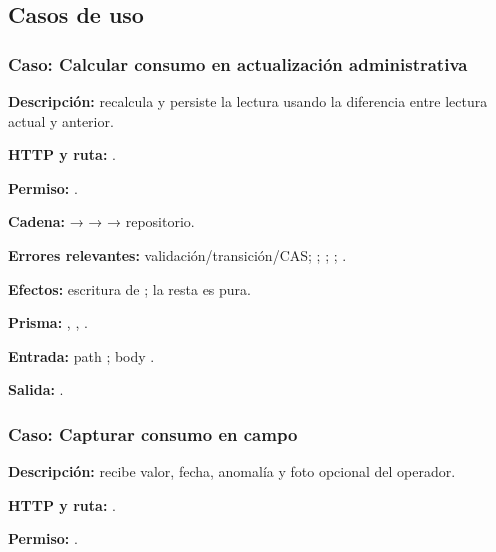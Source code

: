 \subsection{Casos de uso}


\subsubsection{Caso: Calcular consumo en actualización administrativa}


\textbf{Descripción:} recalcula y persiste la lectura usando la diferencia entre lectura actual y anterior.  

\textbf{HTTP y ruta:} \texttt{}.  

\textbf{Permiso:} \texttt{}.  

\textbf{Cadena:} \texttt{} → \texttt{} → \texttt{} → repositorio.  

\textbf{Errores relevantes:} \texttt{} validación/transición/CAS; \texttt{}; \texttt{}; \texttt{}; \texttt{}.  

\textbf{Efectos:} escritura de \texttt{}; la resta es pura.  

\textbf{Prisma:} \texttt{}, \texttt{}, \texttt{}.  

\textbf{Entrada:} path \texttt{}; body \texttt{}.  

\textbf{Salida:} \texttt{}.


\subsubsection{Caso: Capturar consumo en campo}


\textbf{Descripción:} recibe valor, fecha, anomalía y foto opcional del operador.  

\textbf{HTTP y ruta:} \texttt{}.  

\textbf{Permiso:} \texttt{}.  

